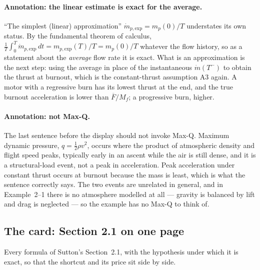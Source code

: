 \paragraph*{Annotation: the linear estimate is exact for the average.}
``The simplest (linear) approximation'' $\dot m_{p,\text{exp}}=m_p(0)/T$
understates its own status. By the fundamental theorem of calculus,
$\frac1T\int_0^T\dot m_{p,\text{exp}}\,dt=m_{p,\text{exp}}(T)/T=m_p(0)/T$
whatever the flow history, so as a statement about the \emph{average} flow
rate it is exact. What is an approximation is the next step: using the
average in place of the instantaneous $\dot m(T^-)$ to obtain the thrust at
burnout, which is the constant-thrust assumption A3 again. A motor with a
regressive burn has its lowest thrust at the end, and the true burnout
acceleration is lower than $\overline F/M_f$; a progressive burn, higher.

\paragraph*{Annotation: not Max-Q.}
The last sentence before the display should not invoke Max-Q. Maximum dynamic
pressure, $q=\tfrac12\rho v^2$, occurs where the product of atmospheric
density and flight speed peaks, typically early in an ascent while the air is
still dense, and it is a structural-load event, not a peak in acceleration.
Peak acceleration under constant thrust occurs at burnout because the mass is
least, which is what the sentence correctly says. The two events are
unrelated in general, and in Example~2--1 there is no atmosphere modelled at
all --- gravity is balanced by lift and drag is neglected --- so the example
has no Max-Q to think of.

\subsection{The card: Section 2.1 on one page}
Every formula of Sutton's Section~2.1, with the hypothesis under which it is
exact, so that the shortcut and its price sit side by side.

